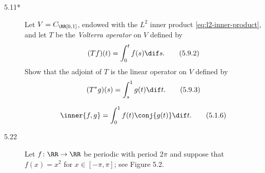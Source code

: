 \documentclass{homework}
\date{Tuesday 2/12}
\author{}
\begin{document}
\begin{description}
\item[5.11*] Let \(V = C_\RR [0, 1]\), endowed with the \(L^2\)
  inner product \eqref{eq:l2-inner-product}, and let \(T\) be the
  \emph{Volterra operator} on \(V\) defined by
  \[
    (Tf)(t) = \int_0^t f(s) \dif s.
    \tag{5.9.2}
  \]
  Show that the adjoint of \(T\) is the linear operator on \(V\)
  defined by
  \[
    (T^* g)(s) = \int_s^1 g(t) \dif t.
    \tag{5.9.3}
  \]

  \begin{book}
    \[
      \inner{f, g} = \int_0^1 f(t) \conj{g(t)} \dif t.
      \tag{5.1.6}
      \label{eq:l2-inner-product}
    \]
  \end{book}


  \begin{solution}

  \end{solution}

\item[5.22] Let \(f \colon \RR \to \RR\) be periodic with period
  \(2\pi\) and suppose that \(f(x) = x^2\) for \(x \in [-\pi, \pi]\);
  see Figure 5.2.  


  \begin{book}
    \begin{center}

    \end{center}
  \end{book}


\end{description}
\end{document}
